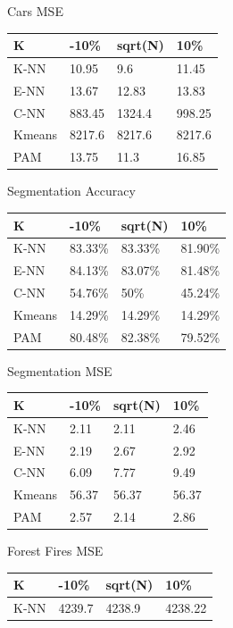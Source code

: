 \documentclass[twoside,11pt]{article}
\begin{document}
\begin{table}[h]
\begin{minipage}[b]{0.45\linewidth}
		Cars MSE
		\centering
		\begin{tabular}{llll}
			\hline
			K      & -10\%  & sqrt(N) & 10\%   \\ \hline
			K-NN   & 10.95  & 9.6     & 11.45  \\
			E-NN   & 13.67  & 12.83   & 13.83  \\
			C-NN   & 883.45 & 1324.4  & 998.25 \\
			Kmeans & 8217.6 & 8217.6  & 8217.6 \\
			PAM    & 13.75  & 11.3    & 16.85
		\end{tabular}
	\end{minipage}
	\begin{minipage}[b]{0.45\linewidth}\centering
		Segmentation Accuracy
		\begin{tabular}{llll}
			\hline
			K      & -10\%   & sqrt(N) & 10\%    \\ \hline
			K-NN   & 83.33\% & 83.33\% & 81.90\% \\
			E-NN   & 84.13\% & 83.07\% & 81.48\% \\
			C-NN   & 54.76\% & 50\%    & 45.24\% \\
			Kmeans & 14.29\% & 14.29\% & 14.29\% \\
			PAM    & 80.48\% & 82.38\% & 79.52\%
		\end{tabular}
	\end{minipage}
	\hspace{0.5cm}
	\begin{minipage}[b]{0.45\linewidth}
		Segmentation MSE
		\centering
		\begin{tabular}{llll}
			\hline
			K      & -10\% & sqrt(N) & 10\%  \\ \hline
			K-NN   & 2.11  & 2.11    & 2.46  \\
			E-NN   & 2.19  & 2.67    & 2.92  \\
			C-NN   & 6.09  & 7.77    & 9.49  \\
			Kmeans & 56.37 & 56.37   & 56.37 \\
			PAM    & 2.57  & 2.14    & 2.86
		\end{tabular}
	\end{minipage}
	\begin{minipage}[b]{0.45\linewidth}\centering
		Forest Fires MSE
		\begin{tabular}{llll}
			\hline
			K      & -10\%   & sqrt(N) & 10\%    \\ \hline
			K-NN   & 4239.7  & 4238.9  & 4238.22 \\

\end{tabular}
\end{minipage}
\end{table}
\end{document}
